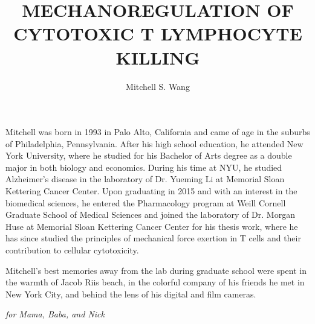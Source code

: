 \documentclass[phd,tocprelim]{cornell}
\title{MECHANOREGULATION OF CYTOTOXIC T LYMPHOCYTE KILLING}
\author {Mitchell S. Wang}
\begin{document}
\maketitle
\makecopyright

\begin{abstract}

\end{abstract}

\begin{biosketch}
Mitchell was born in 1993 in Palo Alto, California and came of age in the suburbs of Philadelphia, Pennsylvania. After his high school education, he attended New York University, where he studied for his Bachelor of Arts degree as a double major in both biology and economics. During his time at NYU, he studied Alzheimer’s disease in the laboratory of Dr. Yueming Li at Memorial Sloan Kettering Cancer Center. Upon graduating in 2015 and with an interest in the biomedical sciences, he entered the Pharmacology program at Weill Cornell Graduate School of Medical Sciences and joined the laboratory of Dr. Morgan Huse at Memorial Sloan Kettering Cancer Center for his thesis work, where he has since studied the principles of mechanical force exertion in T cells and their contribution to cellular cytotoxicity.

Mitchell's best memories away from the lab during graduate school were spent in the warmth of Jacob Riis beach, in the colorful company of his friends he met in New York City, and behind the lens of his digital and film cameras.
\end{biosketch}

\begin{dedication}
\emph{for Mama, Baba, and Nick}
\end{dedication}
\end{document}

